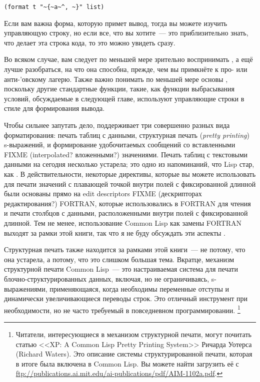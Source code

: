 \begin{lstlisting}
(format t "~{~a~^, ~}" list)
\end{lstlisting}

Если вам важна форма, которую примет вывод, тогда вы можете изучить управляющую строку, но
если все, что вы хотите~--- это приблизительно знать, что делает эта строка кода, то это
можно увидеть сразу.

Во всяком случае, вам следует по меньшей мере зрительно воспринимать , а ещё
лучше разобраться, на что она способна, прежде, чем вы примкнёте к про- или
анти-'овскому лагерю. Также важно понимать по меньшей мере основы
, поскольку другие стандартные функции, такие, как функции выбрасывания
условий, обсуждаемые в следующей главе, используют управляющие строки в стиле
 для формирования вывода.

Чтобы сильнее запутать дело,  поддерживает три совершенно разных вида
форматирования: печать таблиц с данными, структурная печать (\textit{pretty printing})
s-выражений, и формирование удобочитаемых сообщений со вставленными FIXME (interpolated?
вложенными?) значениями. Печать таблиц с текстовыми данными на сегодня несколько устарела;
это одно из напоминаний, что Lisp стар, как . В действительности, некоторые
директивы, которые вы можете использовать для печати значений с плавающей точкой внутри
полей с фиксированной длинной были основаны прямо на edit descriptors FIXME (дескрипторах
редактирования?) FORTRAN, которые использовались в FORTRAN для чтения и печати столбцов с
данными, расположенными внутри полей с фиксированной длинной. Тем не менее, использование
Common Lisp как замены FORTRAN выходят за рамки этой книги, так что я не буду обсуждать
эти аспекты .

Структурная печать также находится за рамками этой книги~--- не потому, что она устарела, а
потому, что это слишком большая тема. Вкратце, механизм структурной печати Common Lisp~---
это настраиваемая система для печати блочно-структурированных данных, включая, но не
ограничиваясь, s-выражениями, применяющаяся, когда необходимы переменные отступы и
динамически увеличивающиеся переводы строк. Это отличный инструмент при необходимости, но
не часто требуемый в повседневном программировании. \footnote{Читатели, интересующиеся в
  механизом структурной печати, могут почитать статью <<XP: A Common Lisp Pretty Printing
  System>> Ричарда Уотерса (Richard Waters). Это описание системы структурированной печати,
  которая в итоге была включена в Common Lisp. Вы можете найти загрузить её с
  \url{ftp://publications.ai.mit.edu/ai-publications/pdf/AIM-1102a.pdf}.}


